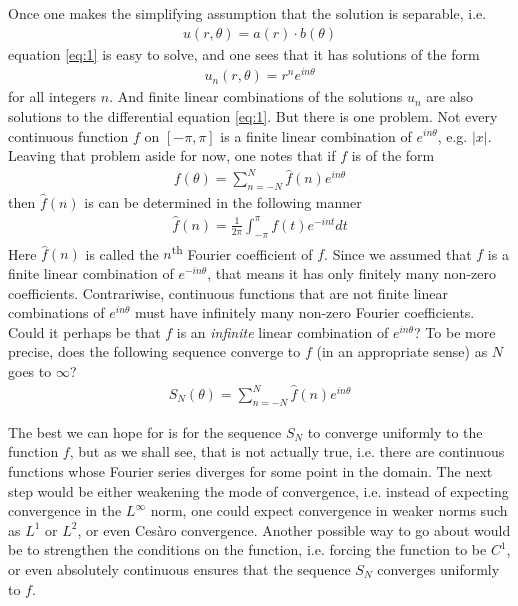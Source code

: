 \documentclass[12pt, titlepage]{article}
\theoremstyle{definition}
\begin{document}
Once one makes the simplifying assumption that the solution is separable, i.e.
\begin{align*}
    u(r, \theta) = a(r) \cdot b(\theta)
\end{align*}
equation \ref{eq:1} is easy to solve, and one sees that it has solutions of the form
\begin{align*}
    u_n(r, \theta) = r^n e^{in\theta}
\end{align*}
for all integers $n$. And finite linear combinations of the solutions $u_n$ are also solutions to the differential equation \ref{eq:1}. But there is one problem. Not every continuous function $f$ on $[-\pi, \pi]$ is a finite linear combination of $e^{in\theta}$, e.g. $|x|$. Leaving that problem aside for now, one notes that if $f$ is of the form
\begin{align*}
    f(\theta) = \sum_{n = -N}^{N} \widehat{f}(n) e^{in\theta}
\end{align*}
then $\widehat{f}(n)$ is can be determined in the following manner
\begin{align}
    \widehat{f}(n) = \frac{1}{2\pi} \int_{-\pi}^{\pi} f(t) e^{-int} dt \label{eq:2}
\end{align}
Here $\widehat{f}(n)$ is called the $n$\textsuperscript{th} Fourier coefficient of $f$. Since we assumed that $f$ is a finite linear combination of $e^{-in\theta}$, that means it has only finitely many non-zero coefficients. Contrariwise, continuous functions that are not finite linear combinations of $e^{in\theta}$ must have infinitely many non-zero Fourier coefficients. Could it perhaps be that $f$ is an \emph{infinite} linear combination of $e^{in\theta}$? To be more precise, does the following sequence converge to $f$ (in an appropriate sense) as $N$ goes to $\infty$?
\begin{align*}
    S_N(\theta) = \sum_{n = -N}^{N} \widehat{f}(n) e^{in\theta}
\end{align*}

The best we can hope for is for the sequence $S_N$ to converge uniformly to the function $f$, but as we shall see, that is not actually true, i.e. there are continuous functions whose Fourier series diverges for some point in the domain. The next step would be either weakening the mode of convergence, i.e. instead of expecting convergence in the $L^{\infty}$ norm, one could expect convergence in weaker norms such as $L^1$ or $L^2$, or even Cesàro convergence. Another possible way to go about would be to strengthen the conditions on the function, i.e. forcing the function to be $C^1$, or even absolutely continuous ensures that the sequence $S_N$ converges uniformly to $f$.
\end{document}
